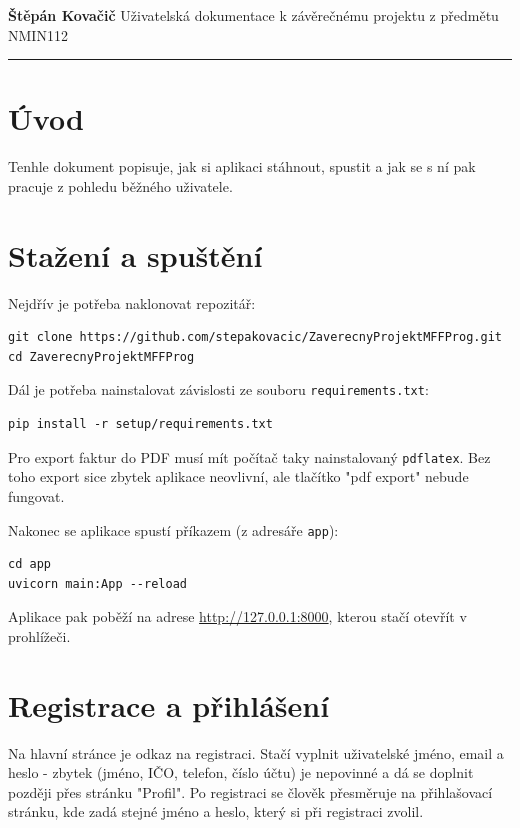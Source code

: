 \documentclass[a4paper,12pt]{article}
\begin{document}
\noindent
{\large \textbf{Štěpán Kovačič}} \hfill {Uživatelská dokumentace k závěrečnému projektu z předmětu NMIN112}\\[-0.2em]

\vspace{0.4em}
\hrule
\vspace{0.6em}

\section*{Úvod}
Tenhle dokument popisuje, jak si aplikaci stáhnout, spustit a jak se s ní
pak pracuje z pohledu běžného uživatele.

\section{Stažení a spuštění}

Nejdřív je potřeba naklonovat repozitář:

\begin{verbatim}
git clone https://github.com/stepakovacic/ZaverecnyProjektMFFProg.git
cd ZaverecnyProjektMFFProg
\end{verbatim}

Dál je potřeba nainstalovat závislosti ze souboru \texttt{requirements.txt}:

\begin{verbatim}
pip install -r setup/requirements.txt
\end{verbatim}

Pro export faktur do PDF musí mít počítač taky nainstalovaný
\texttt{pdflatex}. Bez toho export
sice zbytek aplikace neovlivní, ale tlačítko "pdf export" nebude fungovat.

Nakonec se aplikace spustí příkazem (z adresáře \texttt{app}):

\begin{verbatim}
cd app
uvicorn main:App --reload
\end{verbatim}

Aplikace pak poběží na adrese \url{http://127.0.0.1:8000}, kterou stačí
otevřít v prohlížeči.

\section{Registrace a přihlášení}
Na hlavní stránce je odkaz na registraci. Stačí vyplnit uživatelské jméno,
email a heslo - zbytek (jméno, IČO, telefon, číslo účtu) je nepovinné a dá se
doplnit později přes stránku "Profil". Po registraci se člověk přesměruje na
přihlašovací stránku, kde zadá stejné jméno a heslo, který si při registraci
zvolil.
\end{document}
